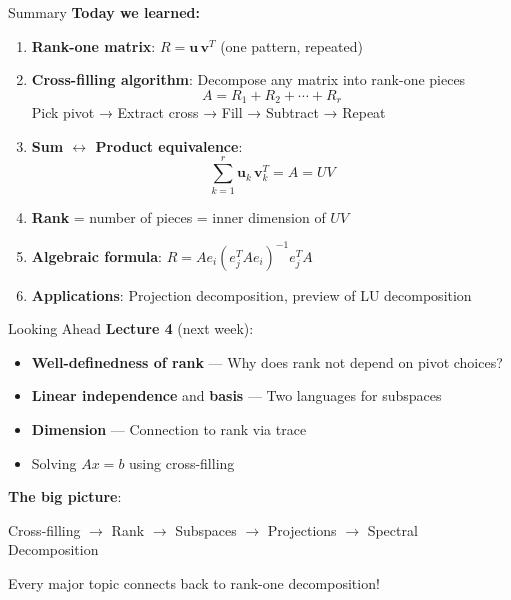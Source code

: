 \documentclass[10pt]{beamer}
\theoremstyle{definition}
\newcommand{\x}[1]{\alert{\textbf{#1}}}
\begin{document}
\begin{frame}{Summary}
\textbf{Today we learned:}

\begin{enumerate}
\item \textbf{Rank-one matrix}: $R = \mathbf{u}\,\mathbf{v}^T$ (one pattern, repeated)

\item \textbf{Cross-filling algorithm}: Decompose any matrix into rank-one pieces
$$A = R_1 + R_2 + \cdots + R_r$$
Pick pivot → Extract cross → Fill → Subtract → Repeat

\item \textbf{Sum $\leftrightarrow$ Product equivalence}:
$$\sum_{k=1}^r \mathbf{u}_k\,\mathbf{v}_k^T = A = UV$$

\item \textbf{Rank} = number of pieces = inner dimension of $UV$

\item \textbf{Algebraic formula}: $R = Ae_i(e_j^TAe_i)^{-1}e_j^TA$

\item \textbf{Applications}: Projection decomposition, preview of LU decomposition
\end{enumerate}
\end{frame}

\begin{frame}{Looking Ahead}
\textbf{Lecture 4} (next week):
\begin{itemize}
\item \x{Well-definedness of rank} — Why does rank not depend on pivot choices?
\item \x{Linear independence} and \x{basis} — Two languages for subspaces
\item \x{Dimension} — Connection to rank via trace
\item Solving $Ax = b$ using cross-filling
\end{itemize}

\vfill
\textbf{The big picture}:
\begin{center}
Cross-filling $\to$ Rank $\to$ Subspaces $\to$ Projections $\to$ Spectral Decomposition
\end{center}

Every major topic connects back to rank-one decomposition!
\end{frame}
\end{document}
